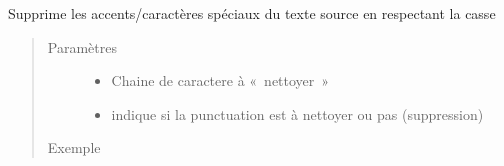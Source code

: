 \documentclass[letterpaper,10pt,french]{sphinxmanual}
\begin{document}
\begin{fulllineitems}
\label{\detokenize{modules/tools:toolbox.tools.clean_coma}}
Supprime les accents/caractères spéciaux du texte source en respectant la casse
\begin{quote}\begin{description}
\item[{Paramètres}] \leavevmode\begin{itemize}
\item {} 
 \textendash{} Chaine de caractere à « nettoyer »

\item {} 
 \textendash{} indique si la punctuation est à nettoyer ou pas (suppression)

\end{itemize}

\item[{Exemple}] \leavevmode
\begin{sphinxVerbatim}[commandchars=\\\{\}]
  
 
  
\end{sphinxVerbatim}

\end{description}\end{quote}

\end{fulllineitems}

\end{document}
